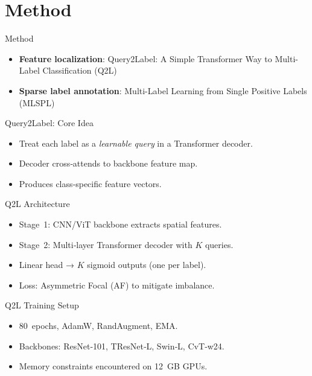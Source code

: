 \section{Method}

\begin{frame}{Method}
  \begin{itemize}
    \item  \textbf{Feature localization}: Query2Label: A Simple Transformer Way to Multi-Label
Classification (Q2L)
    \item \textbf{Sparse label annotation}: Multi-Label Learning from Single Positive Labels (MLSPL)
  \end{itemize}
\end{frame}

\begin{frame}{Query2Label: Core Idea}
  \begin{itemize}
    \item Treat each label as a \emph{learnable query} in a Transformer decoder.
    \item Decoder cross‑attends to backbone feature map.
    \item Produces class‑specific feature vectors.
  \end{itemize}
\end{frame}

\begin{frame}{Q2L Architecture}
  \begin{itemize}
    \item Stage 1: CNN/ViT backbone extracts spatial features.
    \item Stage 2: Multi‑layer Transformer decoder with $K$ queries.
    \item Linear head → $K$ sigmoid outputs (one per label).
    \item Loss: Asymmetric Focal (AF) to mitigate imbalance.
  \end{itemize}
\end{frame}

\begin{frame}{Q2L Training Setup}
  \begin{itemize}
    \item 80 epochs, AdamW, RandAugment, EMA.
    \item Backbones: ResNet‑101, TResNet‑L, Swin‑L, CvT‑w24.
    \item Memory constraints encountered on 12 GB GPUs.
  \end{itemize}
\end{frame}

